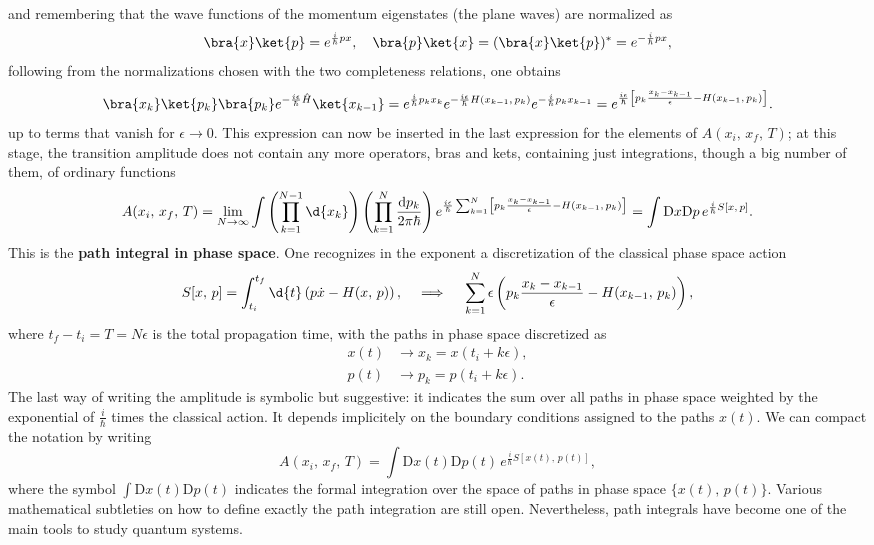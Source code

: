 and remembering that the wave functions of the momentum eigenstates (the plane waves) are normalized as
\[
    \bra{x}\ket{p} = e^{\frac{i}{\hbar}px}, \quad \bra{p}\ket{x} = (\bra{x}\ket{p})^* = e^{-\frac{i}{\hbar}px},
\]
following from the normalizations chosen with the two completeness relations, one obtains
\[
    \bra{x_k}\ket{p_k}\bra{p_k}e^{-\frac{i\epsilon}{\hbar}\hat{H}}\ket{x_{k-1}} = e^{\frac{i}{\hbar}p_k x_k} e^{-\frac{i\epsilon}{\hbar} H(x_{k-1},\,p_k)} e^{-\frac{i}{\hbar}p_k x_{k-1}} = e^{\frac{i\epsilon}{\hbar} \left[p_k \frac{x_k - x_{k-1}}{\epsilon} - H(x_{k-1},\,p_k)\right]}.
\]
up to terms that vanish for \(\epsilon \to 0\). This expression can now be inserted in the last expression for the elements of \(A(x_i,\,x_f,\,T)\); at this stage, the transition amplitude does not contain any more operators, bras and kets, containing just integrations, though a big number of them, of ordinary functions
\[
    A(x_i,\,x_f,\,T) = \lim_{N \to \infty} \int \left(\prod_{k=1}^{N-1} \d{x_k}\right) \left(\prod_{k=1}^{N} \frac{\mathrm{d} p_k}{2\pi \hbar}\right)e^{\frac{i\epsilon}{\hbar}\sum_{k=1}^N \left[p_k \frac{x_k - x_{k-1}}{\epsilon} - H(x_{k-1},\,p_k)\right] } = \int \mathrm{D} x \mathrm{D} p \, e^{\frac{i}{\hbar}S[x,\,p]}.
\]
This is the \textbf{path integral in phase space}. One recognizes in the exponent a discretization of the classical phase space action
\[
    S[x,\,p] = \int_{t_i}^{t_f} \d{t} \left(p\dot{x} - H(x,\,p)\right),\quad \implies \quad \sum_{k=1}^{N} \epsilon\left( p_k \frac{x_k - x_{k-1}}{\epsilon} - H(x_{k-1},\,p_k)\right),
\]
where \(t_f - t_i = T = N\epsilon\) is the total propagation time, with the paths in phase space discretized as
\[
    \begin{aligned}
        x(t) & \longrightarrow x_k = x(t_i + k \epsilon), \\
        p(t) & \longrightarrow p_k = p(t_i + k \epsilon).
    \end{aligned}
\]
The last way of writing the amplitude is symbolic but suggestive: it indicates the sum over all paths in phase space weighted by the exponential of \(\frac{i}{\hbar}\) times the classical action. It depends implicitely on the boundary conditions assigned to the paths \(x(t)\). We can compact the notation by writing
\begin{equation}
    A(x_i,\,x_f,\,T) = \int \mathrm{D} x(t) \mathrm{D} p(t) \, e^{\frac{i}{\hbar}S[x(t),\,p(t)]},
    \label{eq:Path_integral_phase_space}
\end{equation}
where the symbol \(\int \mathrm{D} x(t) \mathrm{D} p(t)\) indicates the formal integration over the space of paths in phase space \(\{x(t),\,p(t)\}\). Various mathematical subtleties on how to define exactly the path integration are still open. Nevertheless, path integrals have become one of the main tools to study quantum systems.

